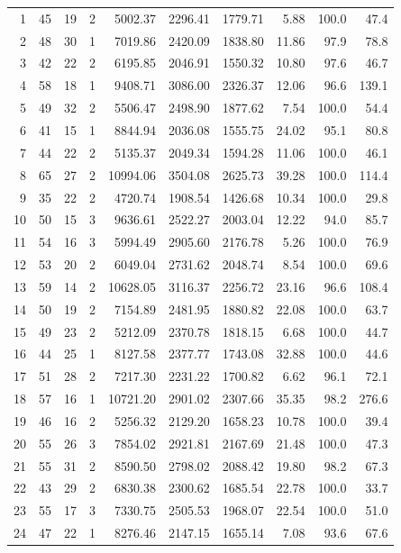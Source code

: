\begin{longtable}{rrrrrrrrrr}
1 & 45 & 19 & 2 & 5002.37 & 2296.41 & 1779.71 & 5.88 & 100.0 & 47.4 \\
2 & 48 & 30 & 1 & 7019.86 & 2420.09 & 1838.80 & 11.86 & 97.9 & 78.8 \\
3 & 42 & 22 & 2 & 6195.85 & 2046.91 & 1550.32 & 10.80 & 97.6 & 46.7 \\
4 & 58 & 18 & 1 & 9408.71 & 3086.00 & 2326.37 & 12.06 & 96.6 & 139.1 \\
5 & 49 & 32 & 2 & 5506.47 & 2498.90 & 1877.62 & 7.54 & 100.0 & 54.4 \\
6 & 41 & 15 & 1 & 8844.94 & 2036.08 & 1555.75 & 24.02 & 95.1 & 80.8 \\
7 & 44 & 22 & 2 & 5135.37 & 2049.34 & 1594.28 & 11.06 & 100.0 & 46.1 \\
8 & 65 & 27 & 2 & 10994.06 & 3504.08 & 2625.73 & 39.28 & 100.0 & 114.4 \\
9 & 35 & 22 & 2 & 4720.74 & 1908.54 & 1426.68 & 10.34 & 100.0 & 29.8 \\
10 & 50 & 15 & 3 & 9636.61 & 2522.27 & 2003.04 & 12.22 & 94.0 & 85.7 \\
11 & 54 & 16 & 3 & 5994.49 & 2905.60 & 2176.78 & 5.26 & 100.0 & 76.9 \\
12 & 53 & 20 & 2 & 6049.04 & 2731.62 & 2048.74 & 8.54 & 100.0 & 69.6 \\
13 & 59 & 14 & 2 & 10628.05 & 3116.37 & 2256.72 & 23.16 & 96.6 & 108.4 \\
14 & 50 & 19 & 2 & 7154.89 & 2481.95 & 1880.82 & 22.08 & 100.0 & 63.7 \\
15 & 49 & 23 & 2 & 5212.09 & 2370.78 & 1818.15 & 6.68 & 100.0 & 44.7 \\
16 & 44 & 25 & 1 & 8127.58 & 2377.77 & 1743.08 & 32.88 & 100.0 & 44.6 \\
17 & 51 & 28 & 2 & 7217.30 & 2231.22 & 1700.82 & 6.62 & 96.1 & 72.1 \\
18 & 57 & 16 & 1 & 10721.20 & 2901.02 & 2307.66 & 35.35 & 98.2 & 276.6 \\
19 & 46 & 16 & 2 & 5256.32 & 2129.20 & 1658.23 & 10.78 & 100.0 & 39.4 \\
20 & 55 & 26 & 3 & 7854.02 & 2921.81 & 2167.69 & 21.48 & 100.0 & 47.3 \\
21 & 55 & 31 & 2 & 8590.50 & 2798.02 & 2088.42 & 19.80 & 98.2 & 67.3 \\
22 & 43 & 29 & 2 & 6830.38 & 2300.62 & 1685.54 & 22.78 & 100.0 & 33.7 \\
23 & 55 & 17 & 3 & 7330.75 & 2505.53 & 1968.07 & 22.54 & 100.0 & 51.0 \\
24 & 47 & 22 & 1 & 8276.46 & 2147.15 & 1655.14 & 7.08 & 93.6 & 67.6 \\

\end{longtable}
